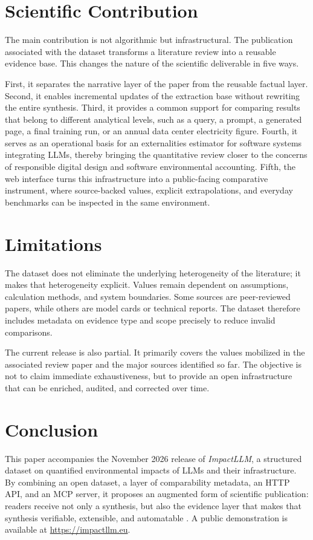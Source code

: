 \documentclass[11pt,a4paper]{article}
\begin{document}
\section{Scientific Contribution}
The main contribution is not algorithmic but infrastructural. The publication associated with the dataset transforms a literature review into a reusable evidence base. This changes the nature of the scientific deliverable in five ways.

First, it separates the narrative layer of the paper from the reusable factual layer. Second, it enables incremental updates of the extraction base without rewriting the entire synthesis. Third, it provides a common support for comparing results that belong to different analytical levels, such as a query, a prompt, a generated page, a final training run, or an annual data center electricity figure. Fourth, it serves as an operational basis for an externalities estimator for software systems integrating LLMs, thereby bringing the quantitative review closer to the concerns of responsible digital design and software environmental accounting. Fifth, the web interface turns this infrastructure into a public-facing comparative instrument, where source-backed values, explicit extrapolations, and everyday benchmarks can be inspected in the same environment.

\section{Limitations}
The dataset does not eliminate the underlying heterogeneity of the literature; it makes that heterogeneity explicit. Values remain dependent on assumptions, calculation methods, and system boundaries. Some sources are peer-reviewed papers, while others are model cards or technical reports. The dataset therefore includes metadata on evidence type and scope precisely to reduce invalid comparisons.

The current release is also partial. It primarily covers the values mobilized in the associated review paper and the major sources identified so far. The objective is not to claim immediate exhaustiveness, but to provide an open infrastructure that can be enriched, audited, and corrected over time.

\section{Conclusion}
This paper accompanies the November 2026 release of \emph{ImpactLLM}, a structured dataset on quantified environmental impacts of LLMs and their infrastructure. By combining an open dataset, a layer of comparability metadata, an HTTP API, and an MCP server, it proposes an augmented form of scientific publication: readers receive not only a synthesis, but also the evidence layer that makes that synthesis verifiable, extensible, and automatable \cite{impactllmrepo2026}. A public demonstration is available at \url{https://impactllm.eu}.
\end{document}
